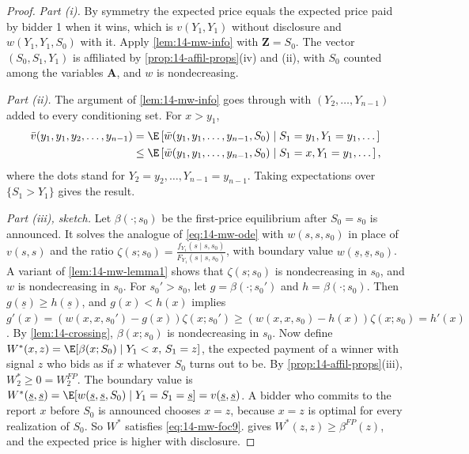 \begin{proof}
\emph{Part (i).} By symmetry the expected price equals the expected price paid by bidder 1 when it wins, which is
$v(Y_1,Y_1)$ without disclosure and $w(Y_1,Y_1,S_0)$ with it. Apply \cref{lem:14-mw-info} with $\bm Z=S_0$.
The vector $(S_0,S_1,Y_1)$ is affiliated by \cref{prop:14-affil-props}(iv) and (ii), with $S_0$ counted
among the variables $\bm A$, and $w$ is nondecreasing.

\emph{Part (ii).} The argument of \cref{lem:14-mw-info} goes through with $(Y_2,\dots,Y_{n-1})$ added to every
conditioning set. For $x>y_1$,
\begin{align*}
  \bar v(y_1,y_1,y_2,\dots,y_{n-1})
  &=\E\left[\bar w(y_1,y_1,\dots,y_{n-1},S_0)\mid S_1=y_1,Y_1=y_1,\dots\right]\\
  &\le\E\left[\bar w(y_1,y_1,\dots,y_{n-1},S_0)\mid S_1=x,Y_1=y_1,\dots\right],
\end{align*}
where the dots stand for $Y_2=y_2,\dots,Y_{n-1}=y_{n-1}$. Taking expectations over $\{S_1>Y_1\}$ gives the
result.

\emph{Part (iii), sketch.} Let $\beta(\cdot;s_0)$ be the first-price equilibrium after $S_0=s_0$ is announced. It
solves the analogue of \eqref{eq:14-mw-ode} with $w(s,s,s_0)$ in place of $v(s,s)$ and the ratio
$\zeta(s;s_0)=\frac{f_{Y_1}(s\mid s,s_0)}{F_{Y_1}(s\mid s,s_0)}$, with boundary value
$w(\underline s,\underline s,s_0)$. A variant of \cref{lem:14-mw-lemma1} shows that $\zeta(s;s_0)$ is
nondecreasing in $s_0$, and $w$ is nondecreasing in $s_0$. For $s_0'>s_0$, let $g=\beta(\cdot;s_0')$ and
$h=\beta(\cdot;s_0)$. Then $g(\underline s)\ge h(\underline s)$, and $g(x)<h(x)$ implies
$g'(x)=(w(x,x,s_0')-g(x))\zeta(x;s_0')\ge(w(x,x,s_0)-h(x))\zeta(x;s_0)=h'(x)$. By
\cref{lem:14-crossing}, $\beta(x;s_0)$ is nondecreasing in $s_0$. Now define
$W^*(x,z)=\E[\beta(x;S_0)\mid Y_1<x,\,S_1=z]$, the expected payment of a winner with signal $z$ who bids as
if $x$ whatever $S_0$ turns out to be. By \cref{prop:14-affil-props}(iii), $W^*_2\ge0=W^{FP}_2$. The boundary
value is $W^*(\underline s,\underline s)=\E[w(\underline s,\underline s,S_0)\mid Y_1=S_1=\underline s]
=v(\underline s,\underline s)$. A bidder who commits to the report $x$ before $S_0$ is announced chooses
$x=z$, because $x=z$ is optimal for every realization of $S_0$. So $W^*$ satisfies \eqref{eq:14-mw-foc9}.
 gives $W^*(z,z)\ge\beta^{FP}(z)$, and the expected price is higher with
disclosure.
\end{proof}

